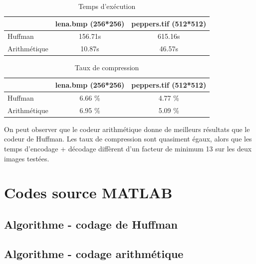 \documentclass[a4paper, 12pt]{article}
\newcommand{\FSource}[1]{%

}
\begin{document}
\begin{table}[!h]
	\centering
		\begin{tabular}{l|c | c|}
			\cline{2-3}
			                                   & lena.bmp (256*256) & peppers.tif (512*512) \\
			\hline
			\multicolumn{1}{|l|}{Huffman}      & 156.71s            &  615.16s               \\
			\hline
			\multicolumn{1}{|l|}{Arithmétique} & 10.87s             &  46.57s                \\
			\hline
		\end{tabular}
	\caption{Temps d’exécution}
	\label{tab:TableTempsExec}
\end{table}

\begin{table}[!h]
	\centering
		\begin{tabular}{l|c | c|}
			\cline{2-3}
			                                   & lena.bmp (256*256) & peppers.tif (512*512) \\
			\hline
			\multicolumn{1}{|l|}{Huffman}      & 6.66 \%            & 4.77 \%               \\
			\hline
			\multicolumn{1}{|l|}{Arithmétique} & 6.95 \%            & 5.09 \%               \\
			\hline
		\end{tabular}
	\caption{Taux de compression}
	\label{tab:TableTauxCompress}
\end{table}

On peut observer que le codeur arithmétique donne de meilleurs résultats que le codeur de Huffman. Les taux de compression sont quasiment égaux, alors que les temps d'encodage + décodage diffèrent d'un facteur de minimum 13 sur les deux images testées.

\clearpage
\appendix

\section{Codes source MATLAB}
\subsection{Algorithme - codage de Huffman}\label{algohuffman}

\FSource{../huffman.m}

\newpage
\subsection{Algorithme - codage arithmétique}\label{algoarithmetique}

\FSource{../arith.m}
\end{document}
